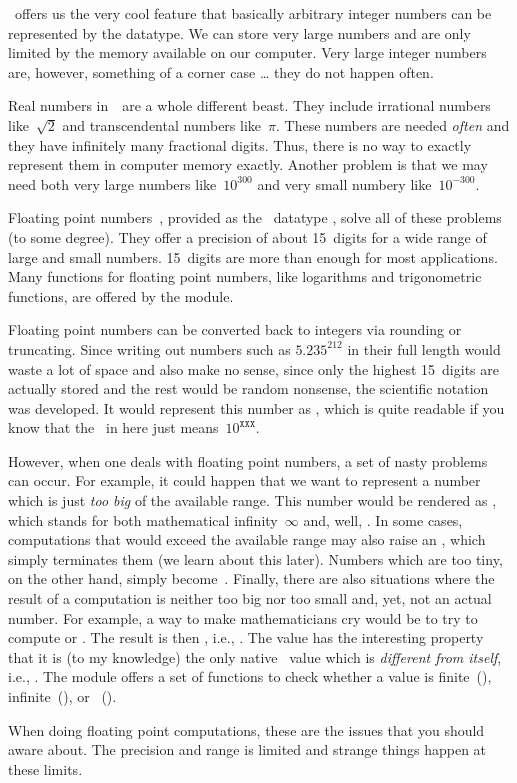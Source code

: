 \python\ offers us the very cool feature that basically arbitrary integer numbers can be represented by the  datatype.
We can store very large numbers and are only limited by the memory available on our computer.
Very large integer numbers are, however, something of a corner case {\dots} they do not happen often.

Real numbers in~\realNumbers\ are a whole different beast.
They include irrational numbers like~$\sqrt{2}$ and transcendental numbers like~$\pi$.
These numbers are needed \emph{often} and they have infinitely many fractional digits.
Thus, there is no way to exactly represent them in computer memory exactly.
Another problem is that we may need both very large numbers like~$10^{300}$ and very small numbery like~$10^{-300}$.

Floating point numbers~\cite{G2023CAIP}, provided as the \python\ datatype , solve all of these problems (to some degree).
They offer a precision of about 15~digits for a wide range of large and small numbers.
15~digits are more than enough for most applications.
Many functions for floating point numbers, like logarithms and trigonometric functions, are offered by the  module.

Floating point numbers can be converted back to integers via rounding or truncating.
Since writing out numbers such as $5.235^{212}$ in their full length would waste a lot of space and also make no sense, since only the highest 15~digits are actually stored and the rest would be random nonsense, the scientific notation was developed.
It would represent this number as , which is quite readable if you know that the~ in  here just means~$10^{\mathtt{XXX}}$.

However, when one deals with floating point numbers, a set of nasty problems can occur.
For example, it could happen that we want to represent a number which is just \emph{too big} of the available range.
This number would be rendered as , which stands for both mathematical infinity~$\infty$ and, well, .
In some cases, computations that would exceed the available range may also raise an , which simply terminates them (we learn about this later).
Numbers which are too tiny, on the other hand, simply become~.
Finally, there are also situations where the result of a computation is neither too big nor too small and, yet, not an actual number.
For example, a way to make mathematicians cry would be to try to compute  or .
The result is then , i.e., .
The value  has the interesting property that it is (to my knowledge) the only native \python\ value which is \emph{different from itself}, i.e., .
The  module offers a set of functions to check whether a value is finite~(), infinite~(), or ~().

When doing floating point computations, these are the issues that you should aware about.
The precision and range is limited and strange things happen at these limits.%
%
\endhsection%
%
\endhsection%
%
